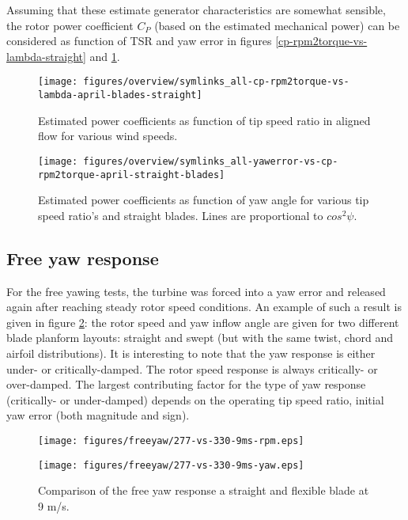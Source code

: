 \documentclass[a4paper]{jpconf}
\begin{document}
Assuming that these estimate generator characteristics are somewhat sensible, the rotor power coefficient $C_P$ (based on the estimated mechanical power) can be considered as function of TSR and yaw error in figures \ref{cp-rpm2torque-vs-lambda-straight} and \ref{cp-rpm2torque-vs-yawerror-straight}.


\begin{figure}[h]
\begin{minipage}{17pc}
\texttt{[image: figures/overview/symlinks\_all-cp-rpm2torque-vs-lambda-april-blades-straight]}
\caption{\label{cp-rpm2torque-vs-lambda-straight} Estimated power coefficients as function of tip speed ratio in aligned flow for various wind speeds.}
\vspace{10px}
\end{minipage}\hspace{3pc}%
\begin{minipage}{17pc}
\texttt{[image: figures/overview/symlinks\_all-yawerror-vs-cp-rpm2torque-april-straight-blades]}
\caption{\label{cp-rpm2torque-vs-yawerror-straight} Estimated power coefficients as function of yaw angle for various tip speed ratio's and straight blades. Lines are proportional to $cos^2 \psi$.}
\end{minipage} 
\end{figure}

\clearpage
\subsection{Free yaw response}

For the free yawing tests, the turbine was forced into a yaw error and released again after reaching steady rotor speed conditions. An example of such a result is given in figure \ref{freeyaw-flex-vs-samo}: the rotor speed and yaw inflow angle are given for two different blade planform layouts: straight and swept (but with the same twist, chord and airfoil distributions). It is interesting to note that the yaw response is either under- or critically-damped. The rotor speed response is always critically- or over-damped. The largest contributing factor for the type of yaw response (critically- or under-damped) depends on the operating tip speed ratio, initial yaw error (both magnitude and sign).

\begin{figure}[h]
\centering
\begin{minipage}{\textwidth}
\centering
\texttt{[image: figures/freeyaw/277-vs-330-9ms-rpm.eps]}
\end{minipage}
\begin{minipage}{\textwidth}
\centering
\texttt{[image: figures/freeyaw/277-vs-330-9ms-yaw.eps]}
\caption{\label{freeyaw-flex-vs-samo} Comparison of the free yaw response a straight and flexible blade at 9 m/s.}
\end{minipage} 
\end{figure}
\end{document}
